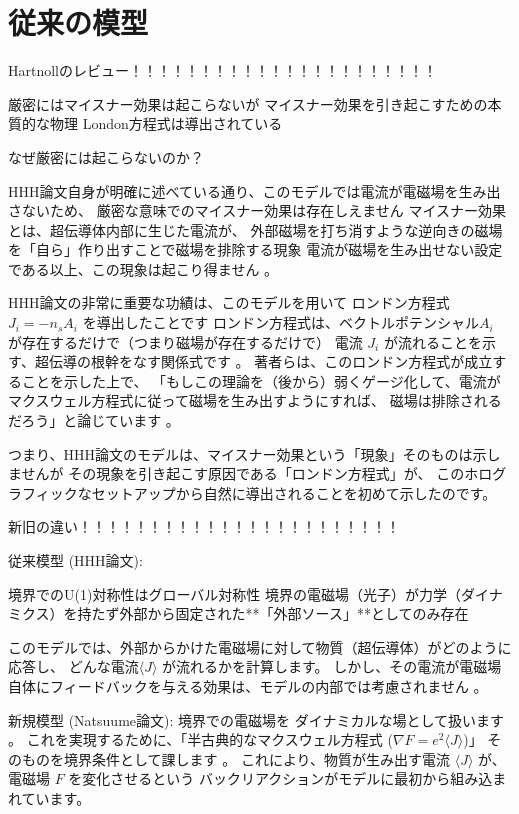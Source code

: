 \documentclass[b5paper,11pt,dvipdfmx]{jsarticle}
\numberwithin{equation}{section}
\theoremstyle{definition}
\begin{document}
\section{従来の模型}

Hartnollのレビュー！！！！！！！！！！！！！！！！！！！！！！

厳密にはマイスナー効果は起こらないが
マイスナー効果を引き起こすための本質的な物理
London方程式は導出されている

なぜ厳密には起こらないのか？

HHH論文自身が明確に述べている通り、このモデルでは電流が電磁場を生み出さないため、
厳密な意味でのマイスナー効果は存在しえません
マイスナー効果とは、超伝導体内部に生じた電流が、
外部磁場を打ち消すような逆向きの磁場を「自ら」作り出すことで磁場を排除する現象
電流が磁場を生み出せない設定である以上、この現象は起こり得ません 。

HHH論文の非常に重要な功績は、このモデルを用いて
ロンドン方程式 $J_i = -n_s A_i$ を導出したことです
ロンドン方程式は、ベクトルポテンシャル$A_i$ が存在するだけで（つまり磁場が存在するだけで）
電流 $J_i$ が流れることを示す、超伝導の根幹をなす関係式です 。
著者らは、このロンドン方程式が成立することを示した上で、
「もしこの理論を（後から）弱くゲージ化して、電流がマクスウェル方程式に従って磁場を生み出すようにすれば、
磁場は排除されるだろう」と論じています 。

つまり、HHH論文のモデルは、マイスナー効果という「現象」そのものは示しませんが
その現象を引き起こす原因である「ロンドン方程式」が、
このホログラフィックなセットアップから自然に導出されることを初めて示したのです。










新旧の違い！！！！！！！！！！！！！！！！！！！！！！！

従来模型 (HHH論文):

境界でのU(1)対称性はグローバル対称性
境界の電磁場（光子）が力学（ダイナミクス）を持たず外部から固定された**「外部ソース」**としてのみ存在

このモデルでは、外部からかけた電磁場に対して物質（超伝導体）がどのように応答し、
どんな電流$\langle J \rangle$ が流れるかを計算します。
しかし、その電流が電磁場自体にフィードバックを与える効果は、モデルの内部では考慮されません 。

新規模型 (Natsuume論文):
境界での電磁場を
ダイナミカルな場として扱います 。
これを実現するために、「半古典的なマクスウェル方程式 ($\nabla F = e^2 \langle J \rangle$)」
そのものを境界条件として課します 。
これにより、物質が生み出す電流 $\langle J \rangle$ が、電磁場 $F$ を変化させるという
バックリアクションがモデルに最初から組み込まれています。
\end{document}

